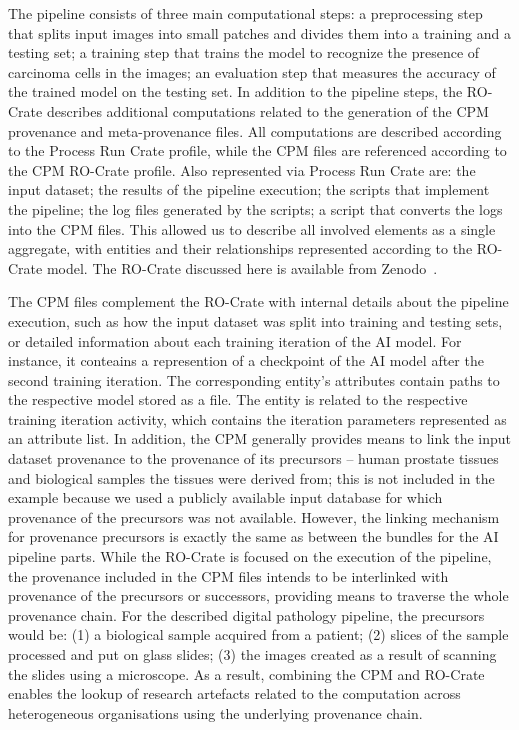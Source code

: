 \documentclass[10pt,letterpaper]{article}
\begin{document}
The pipeline consists of three main computational steps: a preprocessing step that splits input images into small patches and divides them into a training and a testing set; a training step that trains the model to recognize the presence of carcinoma cells in the images; an evaluation step that measures the accuracy of the trained model on the testing set.
In addition to the pipeline steps, the RO-Crate describes additional computations related to the generation of the CPM provenance and meta-provenance files.
All computations are described according to the Process Run Crate profile, while the CPM files are referenced according to the CPM RO-Crate profile. 
Also represented via Process Run Crate are: the input dataset; the results of the pipeline execution; the scripts that implement the pipeline; the log files generated by the scripts; a script that converts the logs into the CPM files.
This allowed us to describe all involved elements as a single aggregate, with entities and their relationships represented according to the RO-Crate model.
The RO-Crate discussed here is available from Zenodo~\cite{Wittner 2023a}.

The CPM files complement the RO-Crate with internal details about the pipeline execution, such as how the input dataset was split into training and testing sets, or detailed information about each training iteration of the AI model.
For instance, it conteains a represention of a checkpoint of the AI model after the second training iteration.
The corresponding entity's attributes contain paths to the respective model stored as a file.
The entity is related to the respective training iteration activity, which contains the iteration parameters represented as an attribute list.
In addition, the CPM generally provides means to link the input dataset provenance to the provenance of its precursors -- human prostate tissues and biological samples the tissues were derived from; this is not included in the example because we used a publicly available input database for which provenance of the precursors was not available.
However, the linking mechanism for provenance precursors is exactly the same as between the bundles for the AI pipeline parts.
While the RO-Crate is focused on the execution of the pipeline, the provenance included in the CPM files intends to be interlinked with provenance of the precursors or successors, providing means to traverse the whole provenance chain.
For the described digital pathology pipeline, the precursors would be: (1) a biological sample acquired from a patient; (2) slices of the sample processed and put on glass slides; (3) the images created as a result of scanning the slides using a microscope.
As a result, combining the CPM and RO-Crate enables the lookup of research artefacts related to the computation across heterogeneous organisations using the underlying provenance chain.
\end{document}
